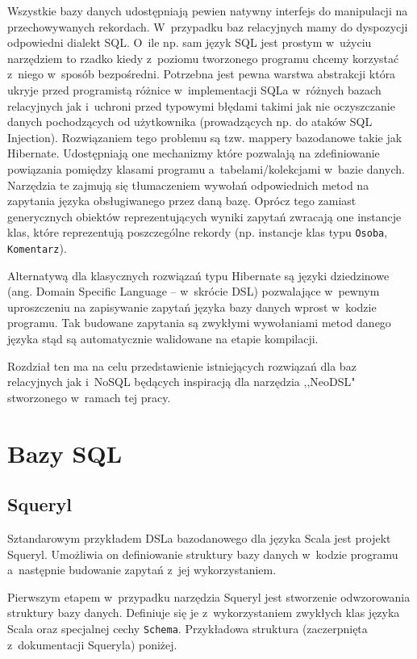 \documentclass[brudnopis]{xmgr}
\begin{document}
Wszystkie bazy danych udostępniają pewien natywny interfejs do manipulacji na przechowywanych rekordach. W~przypadku baz relacyjnych mamy do dyspozycji odpowiedni dialekt SQL. O~ile np. sam język SQL jest prostym w~użyciu narzędziem to rzadko kiedy z~poziomu tworzonego programu chcemy korzystać z~niego w~sposób bezpośredni. Potrzebna jest pewna warstwa abstrakcji która ukryje przed programistą różnice w~implementacji SQLa w~różnych bazach relacyjnych jak i~uchroni przed typowymi błędami takimi jak nie oczyszczanie danych pochodzących od użytkownika (prowadzących np. do ataków SQL Injection). Rozwiązaniem tego problemu są tzw. mappery bazodanowe takie jak Hibernate. Udostępniają one mechanizmy które pozwalają na zdefiniowanie powiązania pomiędzy klasami programu a~tabelami/kolekcjami w~bazie danych. Narzędzia te zajmują się tłumaczeniem wywołań odpowiednich metod na zapytania języka obsługiwanego przez daną bazę. Oprócz tego zamiast generycznych obiektów reprezentujących wyniki zapytań zwracają one instancje klas, które reprezentują poszczególne rekordy (np. instancje klas typu \texttt{Osoba}, \texttt{Komentarz}).

Alternatywą dla klasycznych rozwiązań typu Hibernate są języki dziedzinowe (ang. Domain Specific Language -- w~skrócie DSL)  pozwalające w~pewnym uproszczeniu na zapisywanie zapytań języka bazy danych wprost w~kodzie programu. Tak budowane zapytania są zwykłymi wywołaniami metod danego języka stąd są automatycznie walidowane na etapie kompilacji.

Rozdział ten ma na celu przedstawienie istniejących rozwiązań dla baz relacyjnych jak i~NoSQL będących inspiracją dla narzędzia ,,NeoDSL" stworzonego w~ramach tej pracy.

\section{Bazy SQL}

\subsection{Squeryl}

Sztandarowym przykładem DSLa bazodanowego dla języka Scala jest projekt Squeryl. Umożliwia on definiowanie struktury bazy danych w~kodzie programu a~następnie budowanie zapytań z~jej wykorzystaniem.

Pierwszym etapem w~przypadku narzędzia Squeryl jest stworzenie odwzorowania struktury bazy danych. Definiuje się je z~wykorzystaniem zwykłych klas języka Scala oraz specjalnej cechy \texttt{Schema}. Przykładowa struktura (zaczerpnięta z~dokumentacji Squeryla\cite{squeryl_schemadefinition}) poniżej.
\end{document}
